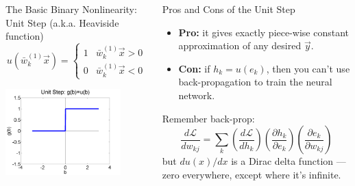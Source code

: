 \documentclass{beamer}
\begin{document}
\begin{frame}
  \begin{columns}[t]
    \column{1.85in}
    \begin{block}{The Basic Binary  Nonlinearity: Unit Step (a.k.a. Heaviside function)}
      \[
      u\left(\bar{w}_k^{(1)}\vec{x}\right)=\begin{cases}
      1 & \bar{w}_k^{(1)}\vec{x} > 0\\
      0 & \bar{w}_k^{(1)}\vec{x} < 0
      \end{cases}
      \]
      \centerline{\includegraphics[width=1.75in]{../lec07/figs/nn_unitstep.png}}
    \end{block}
    \column{2.65in}
    \begin{block}{Pros and Cons of the Unit Step}
      \begin{itemize}
      \item {\bf Pro:} it gives exactly piece-wise constant
        approximation of any desired $\vec{y}$.
      \item {\bf Con:} if $h_k=u(e_k)$, then you can't use
        back-propagation to train the neural network.
      \end{itemize}
      Remember back-prop:
      \[
      \frac{d{\mathcal L}}{dw_{kj}}=
      \sum_k\left(\frac{d{\mathcal L}}{dh_k}\right)
      \left(\frac{\partial h_k}{\partial e_k}\right)
      \left(\frac{\partial e_k}{\partial w_{kj}}\right)
      \]
      but $du(x)/dx$ is a Dirac delta function ---
      zero everywhere, except where it's infinite.
    \end{block}
  \end{columns}
\end{frame}
  
\end{document}
